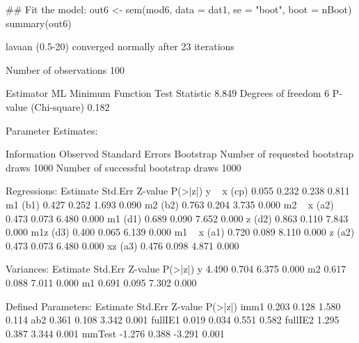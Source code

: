 \begin{Schunk}
\begin{Sinput}
 ## Fit the model:
 out6 <- sem(mod6, data = dat1, se = "boot", boot = nBoot)
 summary(out6)
\end{Sinput}
\begin{Soutput}
lavaan (0.5-20) converged normally after  23 iterations

  Number of observations                           100

  Estimator                                         ML
  Minimum Function Test Statistic                8.849
  Degrees of freedom                                 6
  P-value (Chi-square)                           0.182

Parameter Estimates:

  Information                                 Observed
  Standard Errors                            Bootstrap
  Number of requested bootstrap draws             1000
  Number of successful bootstrap draws            1000

Regressions:
                   Estimate  Std.Err  Z-value  P(>|z|)
  y ~                                                 
    x         (cp)    0.055    0.232    0.238    0.811
    m1        (b1)    0.427    0.252    1.693    0.090
    m2        (b2)    0.763    0.204    3.735    0.000
  m2 ~                                                
    x         (a2)    0.473    0.073    6.480    0.000
    m1        (d1)    0.689    0.090    7.652    0.000
    z         (d2)    0.863    0.110    7.843    0.000
    m1z       (d3)    0.400    0.065    6.139    0.000
  m1 ~                                                
    x         (a1)    0.720    0.089    8.110    0.000
    z         (a2)    0.473    0.073    6.480    0.000
    xz        (a3)    0.476    0.098    4.871    0.000

Variances:
                   Estimate  Std.Err  Z-value  P(>|z|)
    y                 4.490    0.704    6.375    0.000
    m2                0.617    0.088    7.011    0.000
    m1                0.691    0.095    7.302    0.000

Defined Parameters:
                   Estimate  Std.Err  Z-value  P(>|z|)
    imm1              0.203    0.128    1.580    0.114
    ab2               0.361    0.108    3.342    0.001
    fullIE1           0.019    0.034    0.551    0.582
    fullIE2           1.295    0.387    3.344    0.001
    mmTest           -1.276    0.388   -3.291    0.001
\end{Soutput}
\end{Schunk}
